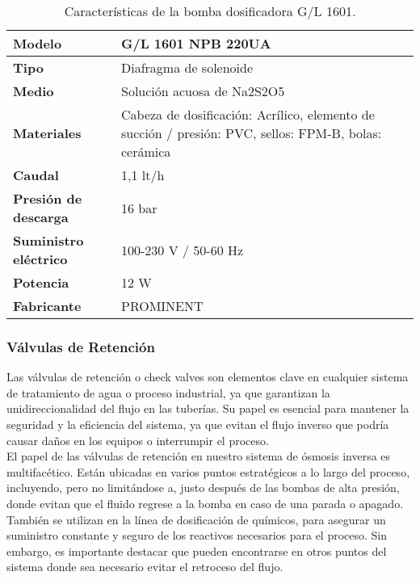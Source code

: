 

\begin{table}[H]
    \centering
    \caption{Características de la bomba dosificadora G/L 1601.}
    \label{table:bomba_dosificadora2}
    \begin{tabular}{| L{6cm} | L{6cm} |}
        \hline
        \textbf{Modelo} & G/L 1601 NPB 220UA  \\
        \hline
        \textbf{Tipo} & Diafragma de solenoide \\
        \hline
        \textbf{Medio} & Solución acuosa de Na2S2O5 \\
        \hline
        \textbf{Materiales} & Cabeza de dosificación: Acrílico, elemento de succión / presión: PVC, sellos: FPM-B, bolas: cerámica \\
        \hline
        \textbf{Caudal} & 1,1 lt/h \\
        \hline
        \textbf{Presión de descarga} & 16 bar \\
        \hline
        \textbf{Suministro eléctrico} & 100-230 V / 50-60 Hz \\
        \hline
        \textbf{Potencia} & 12 W \\
        \hline
        \textbf{Fabricante} & PROMINENT \\
        \hline
    \end{tabular}
\end{table}


\subsubsection{Válvulas de Retención}

Las válvulas de retención o check valves son elementos clave en cualquier sistema de tratamiento de agua o proceso industrial, ya que garantizan la unidireccionalidad del flujo en las tuberías. Su papel es esencial para mantener la seguridad y la eficiencia del sistema, ya que evitan el flujo inverso que podría causar daños en los equipos o interrumpir el proceso.\\

El papel de las válvulas de retención en nuestro sistema de ósmosis inversa es multifacético. Están ubicadas en varios puntos estratégicos a lo largo del proceso, incluyendo, pero no limitándose a, justo después de las bombas de alta presión, donde evitan que el fluido regrese a la bomba en caso de una parada o apagado. También se utilizan en la línea de dosificación de químicos, para asegurar un suministro constante y seguro de los reactivos necesarios para el proceso. Sin embargo, es importante destacar que pueden encontrarse en otros puntos del sistema donde sea necesario evitar el retroceso del flujo.\\

